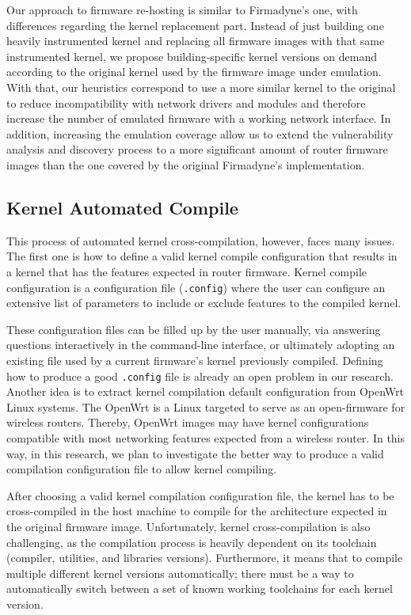 Our approach to firmware re-hosting is similar to Firmadyne's one, with differences regarding the kernel replacement part. Instead of just building one heavily instrumented kernel and replacing all firmware images with that same instrumented kernel, we propose building-specific kernel versions on demand according to the original kernel used by the firmware image under emulation. With that, our heuristics correspond to use a more similar kernel to the original to reduce incompatibility with network drivers and modules and therefore increase the number of emulated firmware with a working network interface. In addition, increasing the emulation coverage allow us to extend the vulnerability analysis and discovery process to a more significant amount of router firmware images than the one covered by the original Firmadyne's implementation.

\subsection{Kernel Automated Compile}

This process of automated kernel cross-compilation, however, faces many issues. The first one is how to define a valid kernel compile configuration that results in a kernel that has the features expected in router firmware. Kernel compile configuration is a configuration file ({\tt .config}) where the user can configure an extensive list of parameters to include or exclude features to the compiled kernel.

These configuration files can be filled up by the user manually, via answering questions interactively in the command-line interface, or ultimately adopting an existing file used by a current firmware's kernel previously compiled. Defining how to produce a good {\tt .config} file is already an open problem in our research. Another idea is to extract kernel compilation default configuration from OpenWrt Linux systems. The OpenWrt is a Linux targeted to serve as an open-firmware for wireless routers. Thereby, OpenWrt images may have kernel configurations compatible with most networking features expected from a wireless router. In this way, in this research, we plan to investigate the better way to produce a valid compilation configuration file to allow kernel compiling.

After choosing a valid kernel compilation configuration file, the kernel has to be cross-compiled in the host machine to compile for the architecture expected in the original firmware image. Unfortunately, kernel cross-compilation is also challenging, as the compilation process is heavily dependent on its toolchain (compiler, utilities, and libraries versions). Furthermore, it means that to compile multiple different kernel versions automatically; there must be a way to automatically switch between a set of known working toolchains for each kernel version.

